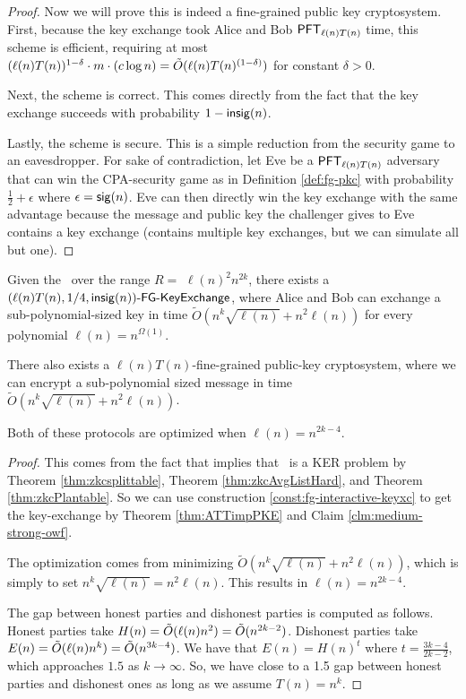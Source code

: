 \begin{proof}
	Now we will prove this is indeed a fine-grained public key cryptosystem. First, because the key exchange took Alice and Bob $\PFT{\ell(n)T(n)}$ time, this scheme is efficient, requiring at most $(\ell(n)T(n))^{1 - \delta} \cdot m \cdot (c \log n) = \~O(\ell(n)T(n)^{(1 - \delta)})$ for constant $\delta > 0$.
	
	Next, the scheme is correct. This comes directly from the fact that the key exchange succeeds with probability $1 - \insig(n)$.
	
	Lastly, the scheme is secure. This is a simple reduction from the security game to an eavesdropper. For sake of contradiction, let Eve be a $\PFT{\ell(n)T(n)}$ adversary that can win the CPA-security game as in Definition \ref{def:fg-pkc} with probability $\frac 1 2 + \epsilon$ where $\epsilon = \sig(n)$. Eve can then directly win the key exchange with the same advantage because the message and public key the challenger gives to Eve contains a key exchange (contains multiple key exchanges, but we can simulate all but one).
\end{proof}

\begin{corollary}
	Given the \strongzkc~over the range $R =$ $\ell(n)^2 n^{2k}$, there exists a $\fgkeyxc{\ell(n)T(n)}{1/4}{\insig(n)}$, where Alice and Bob can exchange a sub-polynomial-sized key in time $\tilde{O}\left(n^{k}\sqrt{\ell(n)} + n^2\ell(n)\right)$ for every polynomial $\ell(n)= n ^{\Omega(1)}$.
	
	There also exists a $\ell(n)T(n)$-fine-grained public-key cryptosystem, where we can encrypt a sub-polynomial sized message in time $\tilde{O}\left(n^{k}\sqrt{\ell(n)} + n^2\ell(n)\right)$.
	
	Both of these protocols are optimized when $\ell(n) = n^{2k-4}$.
	\label{cor:kcliqueKeyExchange}
\end{corollary}
\begin{proof}
	This comes from the fact that \strongzkc implies that \zkclique~is a KER problem by Theorem \ref{thm:zkcsplittable}, Theorem \ref{thm:zkcAvgListHard}, and Theorem \ref{thm:zkcPlantable}.  So we can use construction \ref{const:fg-interactive-keyxc} to get the key-exchange by Theorem \ref{thm:ATTimpPKE} and Claim \ref{clm:medium-strong-owf}. %
	
	The optimization comes from minimizing $\tilde{O}\left(n^{k}\sqrt{\ell(n)} + n^2\ell(n)\right)$, which is simply to set $n^k \sqrt{\ell(n)} = n^2 \ell(n)$. This results in $\ell(n) = n^{2k - 4}$.
	
	The gap between honest parties and dishonest parties is computed as follows. Honest parties take $H(n) = \~O(\ell(n)n^2) = \~O(n^{2k - 2})$. Dishonest parties take $E(n) = \~O(\ell(n)n^k) = \~O(n^{3k - 4})$. We have that $E(n) = H(n)^t$ where $t = \frac{3k-4}{2k-2}$, which approaches $1.5$ as $k \to \infty$. So, we have close to a 1.5 gap between honest parties and dishonest ones as long as we assume $T(n) = n^{k}$.
\end{proof}

